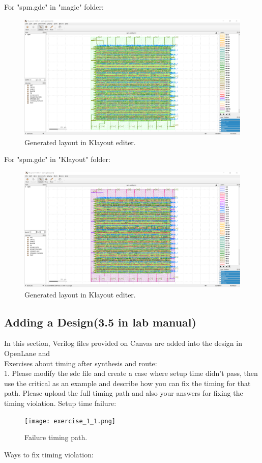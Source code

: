 \documentclass[a4paper]{article}
\begin{document}
For "spm.gdc" in "magic" folder:
\begin{figure}[H]
    \centering
    \includegraphics[width=1\textwidth]{part3_1_1.png}
    \caption{Generated layout in Klayout editer.}
\end{figure}
For "spm.gdc" in "Klayout" folder:
\begin{figure}[H]
    \centering
    \includegraphics[width=1\textwidth]{part3_1_2.png}
    \caption{Generated layout in Klayout editer.}
\end{figure}

\subsection{Adding a Design(3.5 in lab manual)}
In this section, Verilog files provided on Canvas are added into the design in OpenLane and \\

Exercises about timing after synthesis and route: \\

1. Please modify the sdc file and create a case where setup time didn’t pass, then use the critical as an example and describe how you can fix the timing for that path. Please upload the full timing path and also your answers for fixing the timing violation.
Setup time failure:
\begin{figure}[H]
    \centering
    \texttt{[image: exercise\_1\_1.png]}
    \caption{Failure timing path.}
\end{figure}
Ways to fix timing violation:
\end{document}
